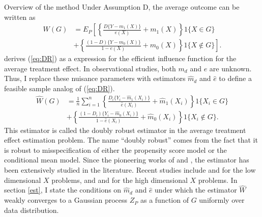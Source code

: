 \documentclass[12pt,oneside,reqno,english]{amsart}
\makeatletter
\renewcommand\subsection{\@startsection{subsection}{2}%
  \z@{-.5\linespacing\@plus-.7\linespacing}{.5\linespacing}%
  {\normalfont\scshape}}
\theoremstyle{definition}
\makeatother
\begin{document}
\subsection{Overview of the method}
Under Assumption D, the average outcome can be written as 
\begin{align}
W(G)&=E_{P}\left[\left\{\frac{D\{Y-m_{1}(X)\}}{e(X)}+m_{1}(X)\right\}1\{X\in G\}\nonumber\right. \\
& \left. +\left\{\frac{(1-D)\{Y-m_{0}(X)\}}{1-e(X)}+m_{0}(X) \right\}1\{X\not\in G\}\right].\label{eq:DR}
\end{align}
\cite{Hahn:98} derives (\ref{eq:DR}) as a expression for the efficient influence function for the average treatment effect. 
 In observational studies, both $m_{d}$ and $e$ are unknown. Thus, I replace these nuisance parameters with estimators $\hat{m}_{d}$ and $\hat{e}$
to define a feasible sample analog of  (\ref{eq:DR}). 
\begin{align}
\hat{W}(G)&=\frac{1}{n}\sum_{i=1}^{n}
\left\{\frac{D_{i}\{Y_{i}-\hat{m}_{1}(X_{i})\}}{\hat{e}(X_{i})}+\hat{m}_{1}(X_{i})\right\}1\{X_{i}\in G\}\nonumber\\
&  +\left\{\frac{(1-D_{i})\{Y_{i}-\hat{m}_{0}(X_{i})\}}{1-\hat{e}(X_{i})}+\hat{m}_{0}(X_{i}) \right\}1\{X_{i}\not\in G\}.\label{eq:DRest}
\end{align}
This estimator is called the doubly robust estimator in the average treatment effect estimation problem. 
The name “doubly robust” comes from the fact that it is robust to misspecification of either the propensity score model or the conditional mean model.
 Since the pioneering works of \cite{RR:95} and 
 \cite{RRZ:95}, the estimator has been extensively studied in the literature. 
Recent studies include \cite{Cattaneo:09} and \cite{RF:18} for the low dimensional $X$ problems, and  \cite{Farrell:15} and \cite{BCFH:17}  
 for the high dimensional $X$ problems. 
In section \ref{est}, I state the conditions on $\hat{m}_{d}$ and $\hat{e}$ under which the estimator $\hat{W}$
weakly converges to a Gaussian process $Z_{P}$ as a function of $G$ uniformly over data distribution. 
\end{document}
